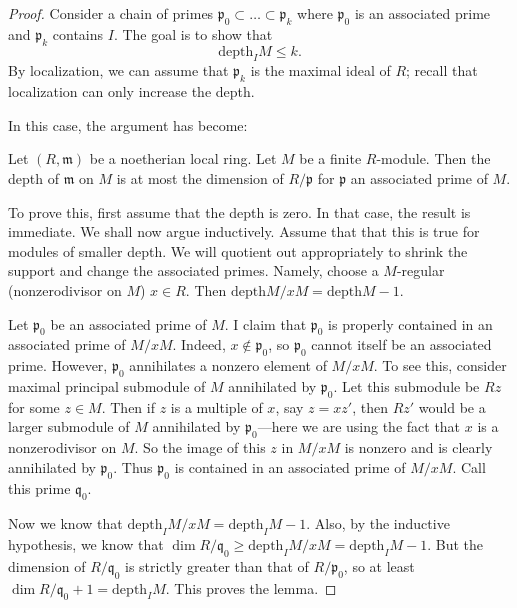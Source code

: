 \begin{proof} Consider a chain of primes $\mathfrak{p}_0 \subset \dots \subset
\mathfrak{p}_k$ where $\mathfrak{p}_0$ is an associated prime and
$\mathfrak{p}_k$ contains $I$. 
The goal is to show that 
\[  \mathrm{depth}_I M \leq k .  \]
By localization, we can assume that $\mathfrak{p}_k$ is the maximal ideal of
$R$; recall that localization can only increase the depth.

In this case, the argument has become:
\begin{lemma} 
Let $(R,\mathfrak{m})$ be a noetherian local ring. Let $M$ be a finite
$R$-module. Then the depth of $\mathfrak{m}$ on $M$ is at most the dimension of
$R/\mathfrak{p}$ for $\mathfrak{p}$ an associated prime of $M$.
\end{lemma} 

To prove this, first assume that the depth is zero. In that case, the result is
immediate. We shall now argue inductively.
Assume that that this is true for modules of smaller depth. 
We will quotient out appropriately to shrink the
support and change the associated 
primes. Namely, choose a $M$-regular (nonzerodivisor on $M$) $x \in R$. 
Then $\mathrm{depth} M/xM = \mathrm{depth} M -1$. 

Let $\mathfrak{p}_0$ be an associated prime of $M$.
I claim that $\mathfrak{p}_0$ is properly contained in an associated prime of
$M/xM$. Indeed, $x \notin \mathfrak{p}_0$, so $\mathfrak{p}_0$ cannot itself be
an associated prime. 
However, $\mathfrak{p}_0$ annihilates a nonzero element of $M/xM$. To see this,
consider maximal principal submodule of $M$ annihilated by $\mathfrak{p}_0$.
Let this submodule be $Rz$ for some $z \in M$. Then if $z$ is a multiple of
$x$, say $z = xz'$, then $Rz'$ would be a larger
submodule of $M$ annihilated by $\mathfrak{p}_0$---here we are using the fact
that $x$ is a nonzerodivisor on $M$. So the image of this $z$ in $M/xM$ is
nonzero and is clearly annihilated by $\mathfrak{p}_0$. 
Thus $\mathfrak{p}_0$ is contained in an associated prime of $M/xM$. Call this
prime $\mathfrak{q}_0$. 

Now we know that $\mathrm{depth}_I M/xM = \mathrm{depth}_I M -1$. Also, by the inductive
hypothesis, we know that $\dim R/\mathfrak{q}_0 \geq \mathrm{depth}_I M/xM = \mathrm{depth}_I M
-1$. But the dimension of $R/\mathfrak{q}_0$ is strictly greater than that of
$R/\mathfrak{p}_0$, so at least $\dim R/\mathfrak{q}_0 +1 = \mathrm{depth}_I M$. This
proves the lemma.
\end{proof} 




